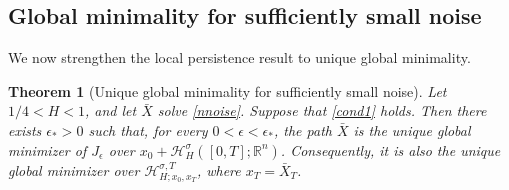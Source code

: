 \documentclass[preprint,12pt]{elsarticle}
\newtheorem{theorem}{Theorem}[section]
\theoremstyle{definition}
\theoremstyle{plain}
\begin{document}
\subsection{Global minimality for sufficiently small noise}

We now strengthen the local persistence result to unique global
minimality.

\begin{theorem}[Unique global minimality for sufficiently small noise]
\label{thm:global-minimality-small-noise}
Let $1/4<H<1$, and let $\bar X$ solve \eqref{nnoise}. Suppose that
\eqref{cond1} holds. Then there exists $\epsilon_*>0$ such that, for
every $0<\epsilon<\epsilon_*$, the path $\bar X$ is the unique global
minimizer of $J_\epsilon$ over
$x_0+\mathcal H_H^\sigma([0,T];\mathbb R^n)$. Consequently, it is also
the unique global minimizer over
$\mathcal H_{H;x_0,x_T}^{\sigma,T}$, where $x_T=\bar X_T$.
\end{theorem}
\end{document}
